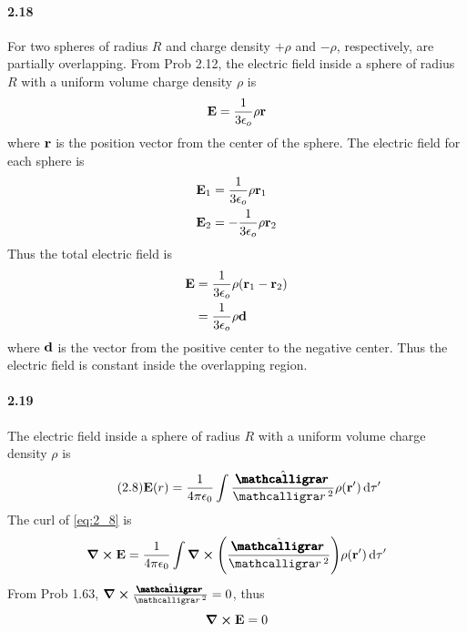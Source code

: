 \documentclass[../main.tex]{subfiles}
\begin{document}
\paragraph{2.18}
For two spheres of radius $R$ and charge density $+\rho$ and $-\rho$, respectively, are partially
overlapping. From Prob 2.12, the electric field inside a sphere of radius $R$ with a uniform volume
charge density $\rho$ is
\[ \vb{E} = \frac{1}{3\epsilon_o} \rho \vb{r} \]
where $\vb{r}$ is the position vector from the center of the sphere. The electric field for each 
sphere is
\begin{align*}
    \vb{E}_1 &= \frac{1}{3\epsilon_o} \rho \vb{r}_1 \\
    \vb{E}_2 &= -\frac{1}{3\epsilon_o} \rho \vb{r}_2
\end{align*}
Thus the total electric field is
\begin{align*}
    \vb{E} &= \frac{1}{3\epsilon_o} \rho (\vb{r}_1 - \vb{r}_2) \\
    &= \frac{1}{3\epsilon_o} \rho \vb{d}
\end{align*}
where $\vb{d}$ is the vector from the positive center to the negative center. Thus the electric
field is constant inside the overlapping region.

\paragraph{2.19}
The electric field inside a sphere of radius $R$ with a uniform volume charge density $\rho$ is
\[\tag{2.8} \label{eq:2_8}
\vb{E}(r) = \ke \int \frac{\hat \boldscriptr}{\scriptr^2} \rho(\vb{r}') \dd{\tau'}
\]
The curl of \eqref{eq:2_8} is
\[
\curl \vb{E} = \ke \int \curl \qt(\frac{\hat \boldscriptr}{\scriptr^2}) \rho(\vb{r}') \dd{\tau'}
\]
From Prob 1.63, \( \curl \frac{\hat \boldscriptr}{\scriptr^2} = 0 \), thus
\[ \curl \vb{E} = 0 \]
\end{document}
